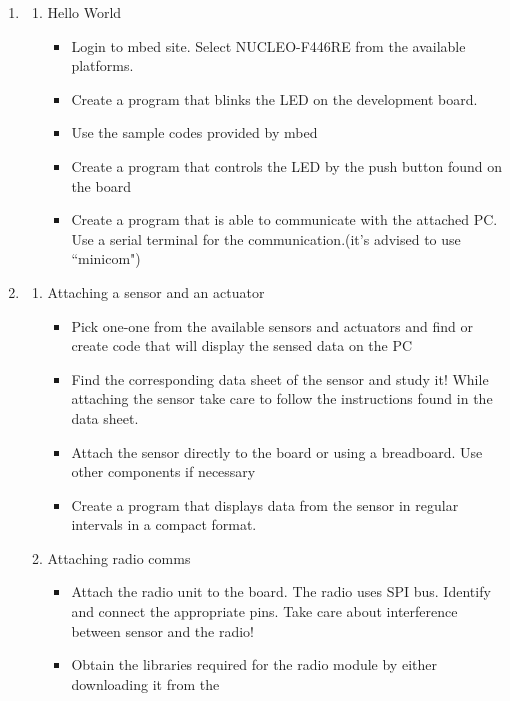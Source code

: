 \documentclass[a4paper]{article}
\begin{document}
\begin{enumerate}
    \item \begin{enumerate}
        \item Hello World
        \begin{itemize}
            \item Login to mbed site. Select NUCLEO-F446RE from the available platforms.
            \item Create a program that blinks the LED on the development board.
            \item Use the sample codes provided by mbed
            \item Create a program that controls the LED by the push button found on the board
            \item Create a program that is able to communicate with the attached PC. Use a serial
            terminal for the communication.(it's advised to use ``minicom")
        \end{itemize}
    \end{enumerate}
    \item \begin{enumerate}
        \item Attaching a sensor and an actuator
        \begin{itemize}
            \item Pick one-one from the available sensors and actuators and find or create code
            that will display the sensed data on the PC
            \item Find the corresponding data sheet of the sensor and study it! While attaching
            the sensor take care to follow the instructions found in the data sheet.
            \item Attach the sensor directly to the board or using a breadboard. Use other components
            if necessary
            \item Create a program that displays data from the sensor in regular intervals in a compact format.
        \end{itemize}
        \item Attaching radio comms
        \begin{itemize}
            \item Attach the radio unit to the board. The radio uses SPI bus. Identify and connect the
            appropriate pins. Take care about interference between sensor and the radio!
            \item Obtain the libraries required for the radio module by either downloading it from the

\end{itemize}
\end{enumerate}
\end{enumerate}
\end{document}
